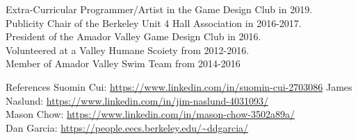 \documentclass{resume} %
\begin{document}
\begin{rSection}{Extra-Curricular} \itemsep -3pt
Programmer/Artist in the Game Design Club in 2019. \\
Publicity Chair of the Berkeley Unit 4 Hall Association in 2016-2017. \\
President of the Amador Valley Game Design Club in 2016. \\
Volunteered at a Valley Humane Scoiety from 2012-2016. \\
Member of Amador Valley Swim Team from 2014-2016
\end{rSection}

%

\begin{rSection}{References}
Suomin Cui: \url{https://www.linkedin.com/in/suomin-cui-2703086}
James Naslund: \url{https://www.linkedin.com/in/jim-naslund-4031093/} \\
Mason Chow: \url{https://www.linkedin.com/in/mason-chow-3502a89a/} \\
Dan Garcia: \url{https://people.eecs.berkeley.edu/~ddgarcia/}
\end{rSection}
\end{document}
